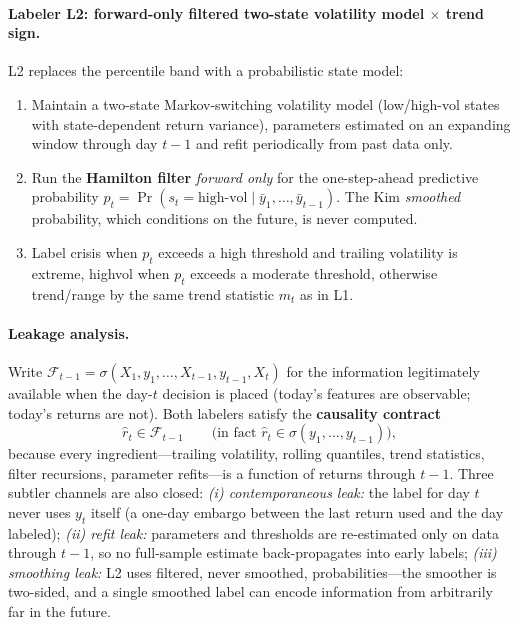 \documentclass[11pt,a4paper]{article}
\theoremstyle{definition}
\theoremstyle{plain}
\begin{document}
\paragraph{Labeler L2: forward-only filtered two-state volatility model
$\times$ trend sign.}
L2 replaces the percentile band with a probabilistic state model:
\begin{enumerate}
  \item Maintain a two-state Markov-switching volatility model (low/high-vol
        states with state-dependent return variance), parameters estimated
        on an expanding window through day $t-1$ and refit periodically from
        past data only.
  \item Run the \textbf{Hamilton filter} \citep{hamilton1989new}
        \emph{forward only} for the one-step-ahead predictive probability
        $p_t = \Pr(s_t = \text{high-vol} \mid \bar y_1, \ldots, \bar y_{t-1})$.
        The Kim \emph{smoothed} probability, which conditions on the future,
        is never computed.
  \item Label \textsf{crisis} when $p_t$ exceeds a high threshold and
        trailing volatility is extreme, \textsf{highvol} when $p_t$ exceeds
        a moderate threshold, otherwise \textsf{trend}/\textsf{range} by the
        same trend statistic $m_t$ as in L1.
\end{enumerate}

\paragraph{Leakage analysis.}
Write $\mathcal{F}_{t-1} = \sigma(X_1, y_1, \ldots, X_{t-1}, y_{t-1}, X_t)$
for the information legitimately available when the day-$t$ decision is
placed (today's features are observable; today's returns are not). Both
labelers satisfy the \textbf{causality contract}
\begin{equation}
\label{eq:dd2-causal}
\hat r_t \in \mathcal{F}_{t-1}
\qquad \text{(in fact } \hat r_t \in \sigma(y_1, \ldots, y_{t-1})\text{)},
\end{equation}
because every ingredient---trailing volatility, rolling quantiles, trend
statistics, filter recursions, parameter refits---is a function of returns
through $t-1$. Three subtler channels are also closed:
\emph{(i) contemporaneous leak:} the label for day $t$ never uses $y_t$
itself (a one-day embargo between the last return used and the day labeled);
\emph{(ii) refit leak:} parameters and thresholds are re-estimated only on
data through $t-1$, so no full-sample estimate back-propagates into early
labels;
\emph{(iii) smoothing leak:} L2 uses filtered, never smoothed,
probabilities---the smoother is two-sided, and a single smoothed label can
encode information from arbitrarily far in the future.
\end{document}
